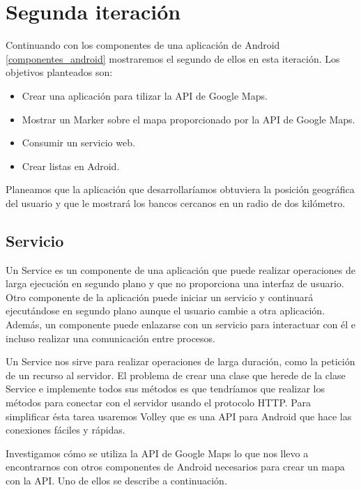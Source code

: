 \newpage
\section{Segunda iteración}
\noindent
Continuando con los componentes de una aplicación de Android \ref{componentes_android} mostraremos el segundo de ellos en esta iteración. Los objetivos planteados son: 
\begin{itemize}
	\item Crear una aplicación para tilizar la API de Google Maps.
	\item Mostrar un Marker sobre el mapa proporcionado por la API de Google Maps.
	\item Consumir un servicio web.
	\item Crear listas en Adroid.
\end{itemize}

\noindent
Planeamos que la aplicación que desarrollaríamos obtuviera la posición geográfica del usuario y que le mostrará los bancos cercanos en un radio de dos kilómetro. 

\subsection{Servicio}

\noindent
Un Service es un componente de una aplicación que puede realizar operaciones de larga ejecución en segundo plano y que no proporciona una interfaz de usuario. Otro componente de la aplicación puede iniciar un servicio y continuará ejecutándose en segundo plano aunque el usuario cambie a otra aplicación. Además, un componente puede enlazarse con un servicio para interactuar con él e incluso realizar una comunicación entre procesos.\cite{service}

\noindent
Un Service nos sirve para realizar operaciones de larga duración, como la petición de un recurso al servidor. El problema de crear una clase que herede de la clase Service e implemente todos sus métodos es que tendríamos que realizar los métodos para conectar con el servidor usando el protocolo HTTP. Para simplificar ésta tarea usaremos Volley que es una API para Android que hace las conexiones fáciles y rápidas.\cite{volley}

\noindent
Investigamos cómo se utiliza la API de Google Maps lo que nos llevo a encontrarnos con otros componentes de Android necesarios para crear un mapa con la API. Uno de ellos se describe a continuación.

